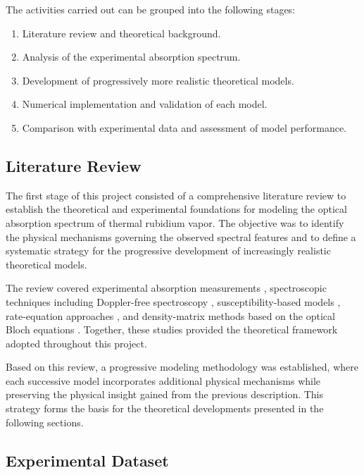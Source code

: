 \documentclass[11pt]{article}
\numberwithin{equation}{section}
\begin{document}
The activities carried out can be grouped into the following stages:

\begin{enumerate}
    \item Literature review and theoretical background.
    \item Analysis of the experimental absorption spectrum.
    \item Development of progressively more realistic theoretical models.
    \item Numerical implementation and validation of each model.
    \item Comparison with experimental data and assessment of model performance.
\end{enumerate}

\subsection{Literature Review}

The first stage of this project consisted of a comprehensive literature review to establish the theoretical and experimental foundations for modeling the optical absorption spectrum of thermal rubidium vapor. The objective was to identify the physical mechanisms governing the observed spectral features and to define a systematic strategy for the progressive development of increasingly realistic theoretical models.

The review covered experimental absorption measurements \cite{Ma2017}, spectroscopic techniques including Doppler-free spectroscopy \cite{Jacques2009}, susceptibility-based models \cite{Siddons2008,Agnew2024}, rate-equation approaches \cite{Bala2022}, and density-matrix methods based on the optical Bloch equations \cite{Horn2011}. Together, these studies provided the theoretical framework adopted throughout this project.

Based on this review, a progressive modeling methodology was established, where each successive model incorporates additional physical mechanisms while preserving the physical insight gained from the previous description. This strategy forms the basis for the theoretical developments presented in the following sections.

\subsection{Experimental Dataset}
\end{document}
